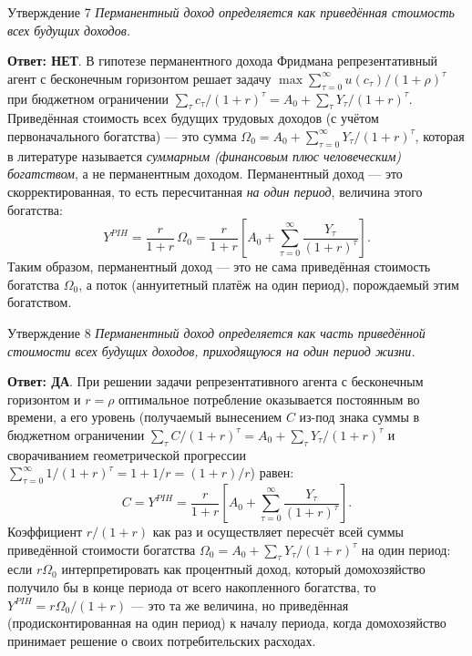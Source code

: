 \documentclass[10pt,a4paper]{article}
\newcommand{\qda}{\textbf{\color{yesgreen}Ответ: ДА}}
\newcommand{\qnet}{\textbf{\color{nored}Ответ: НЕТ}}
\newenvironment{answer}[2]{%
  \begin{qbox}{Утверждение #1}
  \textit{#2}\par\smallskip
}{%
  \end{qbox}\vspace{2pt}
}
\begin{document}
\begin{answer}{7}{Перманентный доход определяется как приведённая стоимость всех будущих доходов.}
\qnet. В гипотезе перманентного дохода Фридмана репрезентативный агент с бесконечным горизонтом решает задачу $\max\sum_{\tau=0}^{\infty}u(c_\tau)/(1+\rho)^\tau$ при бюджетном ограничении $\sum_\tau c_\tau/(1+r)^\tau = A_0+\sum_\tau Y_\tau/(1+r)^\tau$. Приведённая стоимость всех будущих трудовых доходов (с учётом первоначального богатства) — это сумма $\Omega_0=A_0+\sum_{\tau=0}^{\infty}Y_\tau/(1+r)^\tau$, которая в литературе называется \emph{суммарным (финансовым плюс человеческим) богатством}, а не перманентным доходом. Перманентный доход — это скорректированная, то есть пересчитанная \emph{на один период}, величина этого богатства:
\[
Y^{PIH} = \frac{r}{1+r}\,\Omega_0 = \frac{r}{1+r}\left[A_0+\sum_{\tau=0}^{\infty}\frac{Y_\tau}{(1+r)^{\tau}}\right].
\]
Таким образом, перманентный доход — это не сама приведённая стоимость богатства $\Omega_0$, а поток (аннуитетный платёж на один период), порождаемый этим богатством.
\end{answer}
 
\begin{answer}{8}{Перманентный доход определяется как часть приведённой стоимости всех будущих доходов, приходящуюся на один период жизни.}
\qda. При решении задачи репрезентативного агента с бесконечным горизонтом и $r=\rho$ оптимальное потребление оказывается постоянным во времени, а его уровень (получаемый вынесением $C$ из-под знака суммы в бюджетном ограничении $\sum_\tau C/(1+r)^\tau=A_0+\sum_\tau Y_\tau/(1+r)^\tau$ и сворачиванием геометрической прогрессии $\sum_{\tau=0}^\infty 1/(1+r)^\tau=1+1/r=(1+r)/r$) равен:
\[
C = Y^{PIH} = \frac{r}{1+r}\left[A_0+\sum_{\tau=0}^{\infty}\frac{Y_\tau}{(1+r)^{\tau}}\right].
\]
Коэффициент $r/(1+r)$ как раз и осуществляет пересчёт всей суммы приведённой стоимости богатства $\Omega_0=A_0+\sum_\tau Y_\tau/(1+r)^\tau$ на один период: если $r\Omega_0$ интерпретировать как процентный доход, который домохозяйство получило бы в конце периода от всего накопленного богатства, то $Y^{PIH}=r\Omega_0/(1+r)$ — это та же величина, но приведённая (продисконтированная на один период) к началу периода, когда домохозяйство принимает решение о своих потребительских расходах.
\end{answer}
 
\end{document}
